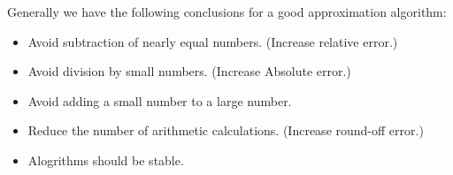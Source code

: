 \documentclass[../main.tex]{subfiles}
\begin{document}
\begin{remark}
  Generally we have the following conclusions for a good approximation algorithm:
  \begin{itemize}
    \item Avoid subtraction of nearly equal numbers. (Increase relative error.)
    \item Avoid division by small numbers. (Increase Absolute error.)
    \item Avoid adding a small number to a large number.
    \item Reduce the number of arithmetic calculations. (Increase round-off error.)
    \item Alogrithms should be stable.
  \end{itemize}
\end{remark}
\end{document}
